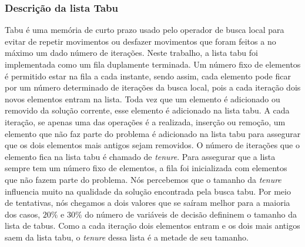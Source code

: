 \documentclass[12pt,a4paper]{article}
\begin{document}
    \subsubsection{Descrição da lista Tabu}

        Tabu é uma memória de curto prazo usado pelo operador de busca local para evitar de repetir movimentos ou desfazer movimentos que foram feitos a no máximo um dado número de iterações. Neste
        trabalho, a lista tabu foi implementada como um fila duplamente terminada. Um número fixo de elementos é permitido estar na fila a cada instante, sendo assim, cada elemento pode ficar por um
        número determinado de iterações da busca local, pois a cada iteração dois novos elementos entram na lista. Toda vez que um elemento é adicionado ou removido da solução corrente, esse
        elemento é adicionado na lista tabu. A cada iteração, se apenas uma das operações é a realizada, inserção ou remoção, um elemento que não faz parte do problema é adicionado na lista tabu
        para assegurar que os dois elementos mais antigos sejam removidos. O número de iterações que o elemento fica na lista tabu é chamado de \textit{tenure}. Para assegurar que a lista sempre tem
        um número fixo de elementos, a fila foi inicializada com elementos que não fazem parte do problema. Nós percebemos que o tamanho da \textit{tenure} influencia muito na qualidade da solução
        encontrada pela busca tabu. Por meio de tentativas, nós chegamos a dois valores que se saíram melhor para a maioria dos casos, $20\%$ e $30\%$ do número de variáveis de decisão defininem o
        tamanho da lista de tabus. Como a cada iteração dois elementos entram e os dois mais antigos saem da lista tabu, o \textit{tenure} dessa lista é a metade de seu tamanho.

\printbibliography
\end{document}
